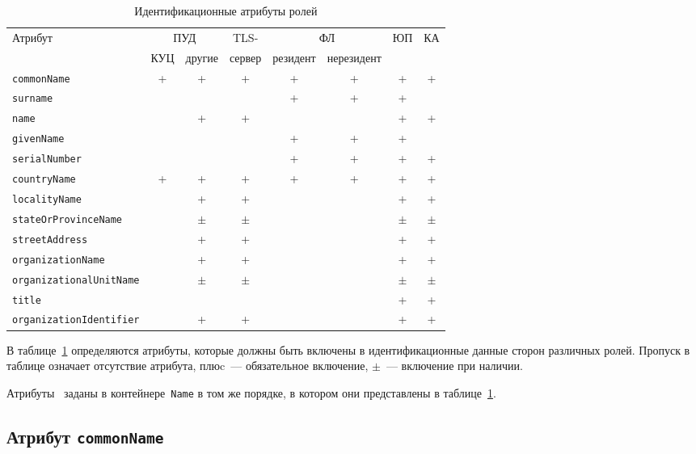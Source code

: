 \begin{table}[bht]
\caption{Идентификационные атрибуты ролей}
\label{Table.ENTITIES.AttrRole}
\begin{tabular}{|l|c|c|c|c|c|c|c|}
\hline
Атрибут & \multicolumn{2}{|c|}{ПУД} & TLS- & 
\multicolumn{2}{|c|}{ФЛ} & ЮП & КА\\
\cline{2-3}
\cline{5-6}
& КУЦ & другие & сервер & резидент & нерезидент & & \\
\hline
\hline
\texttt{commonName} & 
+ & + & + & + & + & + & +\\
\texttt{surname} & 
  &   &   & + & + & + &  \\
\texttt{name} & 
  & + & + &   &   & + &  +\\
\texttt{givenName} & 
  &   &   & + & + & + &  \\
\texttt{serialNumber} & 
  &   &   & + & + & + & +\\
\texttt{countryName} & 
+ & + & + & + & + & + & +\\
\texttt{localityName} & 
  & + & + &   &   & + & +\\
\texttt{stateOrProvinceName} & 
  & $\pm$ & $\pm$ &   &   & $\pm$ & $\pm$\\
\texttt{streetAddress} & 
  & + & + &   &   & + & +\\
\texttt{organizationName} & 
  & + & + &   &   & + & +\\
\texttt{organizationalUnitName} & 
  & $\pm$ & $\pm$ &   &   & $\pm$ & $\pm$\\
\texttt{title} & 
  &   &   &   &   & + & +\\
\texttt{organizationIdentifier} & 
  & + & + &   &   & + & +\\
\hline                                      
\end{tabular}
\end{table}

В таблице~\ref{Table.ENTITIES.AttrRole} определяются атрибуты,
которые должны быть включены в идентификационные данные сторон 
различных ролей. Пропуск в таблице означает отсутствие атрибута,
плюc~--- обязательное включение, $\pm$~--- включение при наличии.

Атрибуты~ заданы в контейнере~\texttt{Name} в том же 
порядке, в котором они представлены в таблице~\ref{Table.ENTITIES.AttrRole}.


\subsection{Атрибут \texttt{commonName}}\label{ENTITIES.Id.CN}

